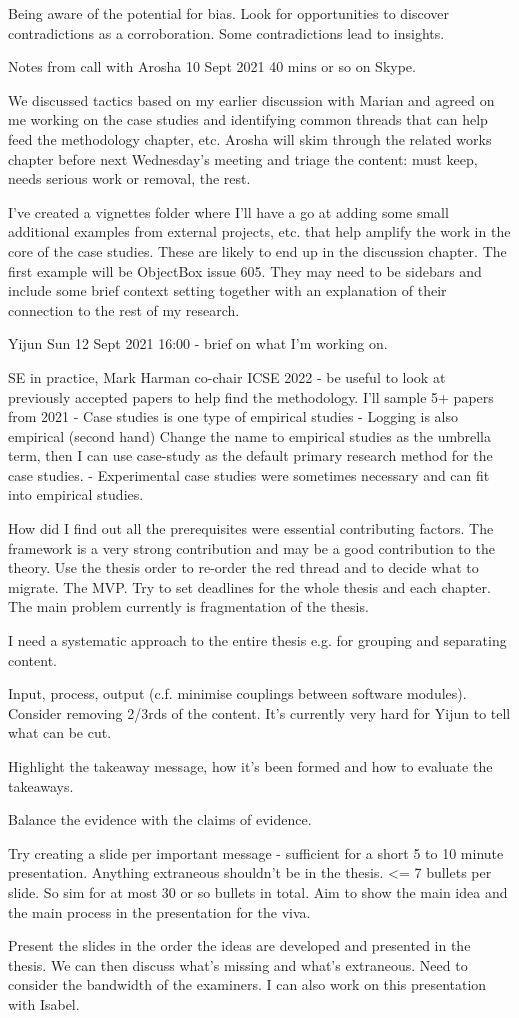 Being aware of the potential for bias.
Look for opportunities to discover contradictions as a corroboration. 
Some contradictions lead to insights.

\hrulefill
Notes from call with Arosha 10 Sept 2021
40 mins or so on Skype.

We discussed tactics based on my earlier discussion with Marian and agreed on me working on the case studies and identifying common threads that can help feed the methodology chapter, etc. Arosha will skim through the related works chapter before next Wednesday's meeting and triage the content: must keep, needs serious work or removal, the rest.

I've created a vignettes folder where I'll have a go at adding some small additional examples from external projects, etc. that help amplify the work in the core of the case studies. These are likely to end up in the discussion chapter. The first example will be ObjectBox issue 605. They may need to be sidebars and include some brief context setting together with an explanation of their connection to the rest of my research.

\hfillrule
Yijun Sun 12 Sept 2021 16:00 - 
brief on what I'm working on.

SE in practice, Mark Harman co-chair ICSE 2022 - be useful to look at previously accepted papers to help find the methodology. I'll sample 5+ papers from 2021
- Case studies is one type of empirical studies
- Logging is also empirical (second hand) 
Change the name to empirical studies as the umbrella term, then I can use case-study as the default primary research method for the case studies.
- Experimental case studies were sometimes necessary and can fit into empirical studies. 

How did I find out all the prerequisites were essential contributing factors. 
The framework is a very strong contribution and may be a good contribution to the theory. 
Use the thesis order to re-order the red thread and to decide what to migrate. The MVP. Try to set deadlines for the whole thesis and each chapter. The main problem currently is fragmentation of the thesis.

I need a systematic approach to the entire thesis e.g. for grouping and separating content. 

Input, process, output (c.f. minimise couplings between software modules).
Consider removing 2/3rds of the content. It's currently very hard for Yijun to tell what can be cut.

Highlight the takeaway message, how it's been formed and how to evaluate the takeaways.

Balance the evidence with the claims of evidence.

Try creating a slide per important message - sufficient for a short 5 to 10 minute presentation. Anything extraneous shouldn't be in the thesis. <= 7 bullets per slide. So sim for at most 30 or so bullets in total. Aim to show the main idea and the main process in the presentation for the viva.

Present the slides in the order the ideas are developed and presented in the thesis. We can then discuss what's missing and what's extraneous. Need to consider the bandwidth of the examiners. I can also work on this presentation with Isabel. 